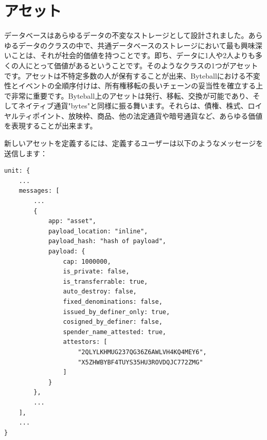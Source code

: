 \documentclass[a4paper, dvipdfmx]{jsarticle}
\begin{document}
\section{アセット}
データベースはあらゆるデータの不変なストレージとして設計されました。あらゆるデータのクラスの中で、共通データベースのストレージにおいて最も興味深いことは、それが社会的価値を持つことです。即ち、データに1人や2人よりも多くの人にとって価値があるということです。そのようなクラスの1つがアセットです。アセットは不特定多数の人が保有することが出来、Byteballにおける不変性とイベントの全順序付けは、所有権移転の長いチェーンの妥当性を確立する上で非常に重要です。Byteball上のアセットは発行、移転、交換が可能であり、そしてネイティブ通貨"bytes"と同様に振る舞います。それらは、債権、株式、ロイヤルティポイント、放映枠、商品、他の法定通貨や暗号通貨など、あらゆる価値を表現することが出来ます。

新しいアセットを定義するには、定義するユーザーは以下のようなメッセージを送信します：

\begin{lstlisting}[basicstyle=\ttfamily\footnotesize, frame=none]
unit: {
    ...
    messages: [
        ...
        {
            app: "asset",
            payload_location: "inline",
            payload_hash: "hash of payload",
            payload: {
                cap: 1000000,
                is_private: false,
                is_transferrable: true,
                auto_destroy: false,
                fixed_denominations: false,
                issued_by_definer_only: true,
                cosigned_by_definer: false,
                spender_name_attested: true,
                attestors: [
                    "2QLYLKHMUG237QG36Z6AWLVH4KQ4MEY6",
                    "X5ZHWBYBF4TUYS35HU3ROVDQJC772ZMG"
                ]
            }
        },
        ...
    ],
    ...
}
\end{lstlisting}
\end{document}
